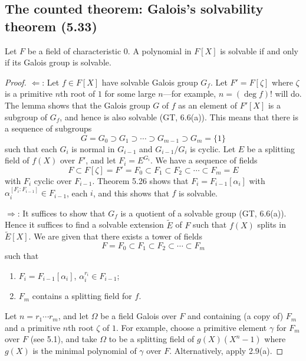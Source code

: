 \subsection*{The counted theorem: Galois's solvability theorem (5.33)}
\begin{theorem}[5.33]
Let $F$ be a field of characteristic $0$. A polynomial in $F[X]$ is solvable if and only if its Galois group is solvable.
\end{theorem}
\begin{proof}
$\Longleftarrow$: Let $f\in F[X]$ have solvable Galois group $G_f$. Let $F'=F[\zeta]$ where $\zeta$ is a primitive $n$th root of $1$ for some large $n$---for example, $n=(\deg f)!$ will do. The lemma shows that the Galois group $G$ of $f$ as an element of $F'[X]$ is a subgroup of $G_f$, and hence is also solvable (GT, 6.6(a)). This means that there is a sequence of subgroups
\[
G=G_0\supset G_1\supset\cdots\supset G_{m-1}\supset G_m=\{1\}
\]
such that each $G_i$ is normal in $G_{i-1}$ and $G_{i-1}/G_i$ is cyclic. Let $E$ be a splitting field of $f(X)$ over $F'$, and let $F_i=E^{G_i}$. We have a sequence of fields
\[
F\subset F[\zeta]=F'=F_0\subset F_1\subset F_2\subset\cdots\subset F_m=E
\]
with $F_i$ cyclic over $F_{i-1}$. Theorem 5.26 shows that $F_i=F_{i-1}[\alpha_i]$ with $\alpha_i^{[F_i:F_{i-1}]}\in F_{i-1}$, each $i$, and this shows that $f$ is solvable.

$\Longrightarrow$: It suffices to show that $G_f$ is a quotient of a solvable group (GT, 6.6(a)). Hence it suffices to find a solvable extension $\widetilde E$ of $F$ such that $f(X)$ splits in $\widetilde E[X]$.
We are given that there exists a tower of fields
\[
F=F_0\subset F_1\subset F_2\subset\cdots\subset F_m
\]
such that
\begin{enumerate}[label=(\alph*)]
\item $F_i=F_{i-1}[\alpha_i]$, $\alpha_i^{r_i}\in F_{i-1}$;
\item $F_m$ contains a splitting field for $f$.
\end{enumerate}
Let $n=r_1\cdots r_m$, and let $\Omega$ be a field Galois over $F$ and containing (a copy of) $F_m$ and a primitive $n$th root $\zeta$ of $1$. For example, choose a primitive element $\gamma$ for $F_m$ over $F$ (see 5.1), and take $\Omega$ to be a splitting field of $g(X)(X^n-1)$ where $g(X)$ is the minimal polynomial of $\gamma$ over $F$. Alternatively, apply 2.9(a).


\end{proof}

